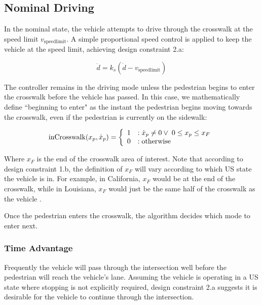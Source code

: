 \documentclass[letterpaper, 10 pt, conference]{ieeeconf}  %
\begin{document}
\subsection{Nominal Driving}
In the nominal state, the vehicle attempts to drive through the crosswalk at the speed limit $v_\mathrm{speedlimit}$. A simple proportional speed control is applied to keep the vehicle at the speed limit, achieving design constraint 2.a:

\begin{equation}
	\ddot{d} = k_s(\dot{d} - v_\mathrm{speedlimit})
\end{equation}

The controller remains in the driving mode unless the pedestrian begins to enter the crosswalk before the vehicle has passed. In this case, we mathematically define ``beginning to enter" as the instant the pedestrian begins moving towards the crosswalk, even if the pedestrian is currently on the sidewalk:

\begin{equation}
\label{eq:crossing}
\mathrm{inCrosswalk}(x_p, 
\dot{x}_p) = \left\{
  \begin{array}{ll}
    1&: \dot{x}_p \neq 0 \vee \hspace{1 mm} 0 \leq x_p \leq x_F \\
    0&: \mathrm{otherwise} 
  \end{array}
\right.
\end{equation}

 Where $x_F$ is the end of the crosswalk area of interest. Note that according to design constraint 1.b, the definition of $x_F$ will vary according to which US state the vehicle is in. For example, in California, $x_F$ would be at the end of the crosswalk, while in Louisiana, $x_F$ would just be the same half of the crosswalk as the vehicle \cite{Legislatures2018}.  

Once the pedestrian enters the crosswalk, the algorithm decides which mode to enter next. 

\subsubsection{Time Advantage}

Frequently the vehicle will pass through the intersection well before the pedestrian will reach the vehicle's lane. Assuming the vehicle is operating in a US state where stopping is not explicitly required, design constraint 2.a suggests it is desirable for the vehicle to continue through the intersection.
\end{document}
